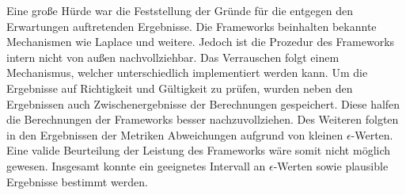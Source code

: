 Eine große Hürde war die Feststellung der Gründe für die entgegen den Erwartungen auftretenden Ergebnisse. Die Frameworks beinhalten bekannte Mechanismen wie Laplace und weitere. Jedoch ist die Prozedur des Frameworks intern nicht von außen nachvollziehbar. Das Verrauschen folgt einem Mechanismus, welcher unterschiedlich implementiert werden kann. Um die Ergebnisse auf Richtigkeit und Gültigkeit zu prüfen, wurden neben den Ergebnissen auch Zwischenergebnisse der Berechnungen gespeichert. Diese halfen die Berechnungen der Frameworks besser nachzuvollziehen. Des Weiteren folgten in den Ergebnissen der Metriken Abweichungen aufgrund von kleinen $\epsilon$-Werten. Eine valide Beurteilung der Leistung des Frameworks wäre somit nicht möglich gewesen. Insgesamt konnte ein geeignetes Intervall an $\epsilon$-Werten sowie plausible Ergebnisse bestimmt werden. 